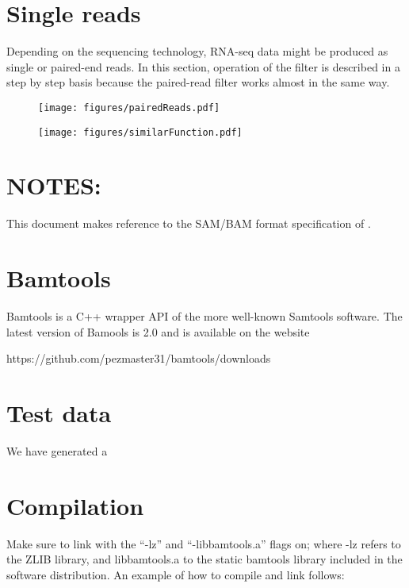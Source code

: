 \documentclass[11pt]{article}
\begin{document}
{\section{Single reads}
Depending on the sequencing technology, RNA-seq data might be produced as single or paired-end reads. In 
this section, operation of the filter is described in a step by step basis because the paired-read filter 
works almost in the same way. 



\begin{figure}
\begin{center}
\texttt{[image: figures/pairedReads.pdf]}
\end{center}
\end{figure}

\begin{figure}
\begin{center}
\texttt{[image: figures/similarFunction.pdf]}
\end{center}
\end{figure}

\section{NOTES:}  
This document makes reference to the SAM/BAM format specification of \citet{heng09:SAM}.

\section{Bamtools}
Bamtools is a C++ wrapper API of the more well-known Samtools software. The latest version of Bamools 
is 2.0 and is available on the website 
	\begin{center}
		https://github.com/pezmaster31/bamtools/downloads
	\end{center}
\item 

\section{Test data}
We have generated a 

\section{Compilation}
Make sure to link with the ``-lz'' and ``-libbamtools.a'' flags on; where -lz refers to the ZLIB library, 
and libbamtools.a to the static bamtools library included in the software distribution. An example of 
how to compile and link follows: 

}
\end{document}
